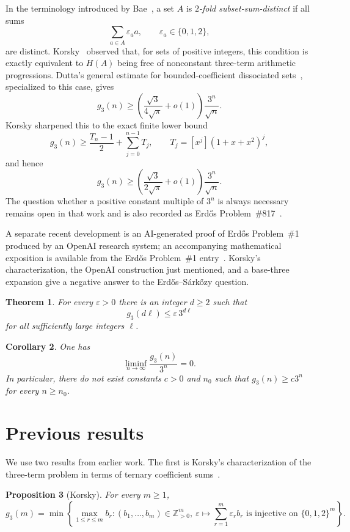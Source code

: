 \documentclass[10pt,a4paper]{amsart}
\newtheorem{theorem}{Theorem}[section]
\newtheorem{proposition}[theorem]{Proposition}
\newtheorem{corollary}[theorem]{Corollary}
\theoremstyle{remark}
\newcommand{\Z}{\mathbb Z}
\newcommand{\ee}{\varepsilon}
\begin{document}
In the terminology introduced by Bae~\cite{Bae2002}, a set $A$ is \emph{$2$-fold subset-sum-distinct} if all sums
\[
 \sum_{a\in A}\varepsilon_a a,\qquad \varepsilon_a\in\{0,1,2\},
\]
are distinct. Korsky~\cite[Proposition~4.1 and Corollary~4.2]{Korsky2026} observed that, for sets of positive integers, this condition is exactly equivalent to $H(A)$ being free of nonconstant three-term arithmetic progressions. Dutta's general estimate for bounded-coefficient dissociated sets~\cite{Dutta2026}, specialized to this case, gives
\[
 g_3(n)\ge
 \left(\frac{\sqrt3}{4\sqrt\pi}+o(1)\right)\frac{3^n}{\sqrt n}.
\]
Korsky sharpened this to the exact finite lower bound
\[
 g_3(n)\ge \frac{T_n-1}{2}+\sum_{j=0}^{n-1}T_j,
 \qquad T_j=[x^j](1+x+x^2)^j,
\]
and hence
\[
 g_3(n)\ge
 \left(\frac{\sqrt3}{2\sqrt\pi}+o(1)\right)\frac{3^n}{\sqrt n}.
\]
The question whether a positive constant multiple of $3^n$ is always necessary remains open in that work and is also recorded as Erd\H{o}s Problem~\#817~\cite{BloomErdos817}.

A separate recent development is an AI-generated proof of Erd\H{o}s Problem~\#1 produced by an OpenAI research system; an accompanying mathematical exposition is available from the Erd\H{o}s Problem~\#1 entry~\cite{BloomErdos1,OpenAI2026}. Korsky's characterization, the OpenAI construction just mentioned, and a base-three expansion give a negative answer to the Erd\H{o}s--S\'ark\H{o}zy question.

\begin{theorem}\label{thm:main}
For every $\ee>0$ there is an integer $d\ge2$ such that
\[
 g_3(d\ell)\le \ee\,3^{d\ell}
\]
for all sufficiently large integers $\ell$.
\end{theorem}

\begin{corollary}\label{cor:liminf}
One has
\[
 \liminf_{n\to\infty}\frac{g_3(n)}{3^n}=0.
\]
In particular, there do not exist constants $c>0$ and $n_0$ such that $g_3(n)\ge c3^n$ for every $n\ge n_0$.
\end{corollary}

\section{Previous results}

We use two results from earlier work. The first is Korsky's characterization of the three-term problem in terms of ternary coefficient sums~\cite[Corollary~4.2]{Korsky2026}.

\begin{proposition}[Korsky]\label{prop:korsky}
For every $m\ge1$,
\[
 g_3(m)=\min\left\{\max_{1\le r\le m}b_r:
 (b_1,\ldots,b_m)\in\Z_{>0}^m,\ 
 \varepsilon\longmapsto\sum_{r=1}^m\varepsilon_r b_r
 \text{ is injective on }\{0,1,2\}^m\right\}.
\]
\end{proposition}
\end{document}

